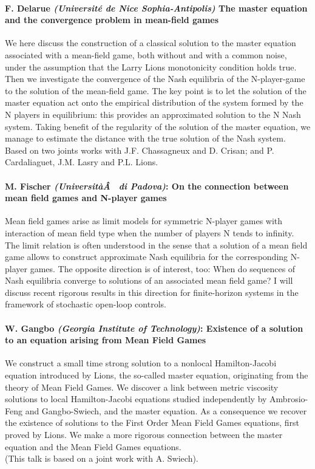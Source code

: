 \documentclass[11pt]{article}
\begin{document}
\paragraph{F. Delarue  {\sl (Universit{\'e}  de Nice Sophia-Antipolis)}
   The master equation and the convergence problem in mean-field games}
    We here discuss the construction of a classical solution to the 
master equation associated with a mean-field game, both without and with
 a common noise, under the assumption that the Larry Lions monotonicity 
condition holds true. Then we investigate the convergence of the Nash 
equilibria of the N-player-game to the solution of the mean-field game. 
The key point is to let the solution of the master equation act onto the
 empirical distribution of the system formed by the N players in 
equilibrium: this provides an approximated solution to the N Nash 
system. Taking benefit of the regularity of the solution of the master 
equation, we manage to estimate the distance with the true solution of 
the Nash system.\\
 Based on two joints works with J.F. Chassagneux and D. 
Crisan; and P. Cardaliaguet, J.M. Lasry and P.L. Lions. 

\paragraph{ M. Fischer {\sl (Universit{\`a}{\^A}  di Padova)}:
   On the connection between mean field games and N-player games}
Mean field games arise as limit models for symmetric N-player games 
with interaction of mean field type when the number of players N tends 
to infinity. The limit relation is often understood in the sense that a 
solution of a mean field game allows to construct approximate Nash 
equilibria for the corresponding N-player games. The opposite direction 
is of interest, too: When do sequences of Nash equilibria converge to 
solutions of an associated mean field game? I will discuss recent 
rigorous results in this direction for finite-horizon systems in the 
framework of stochastic open-loop controls. 


\paragraph{ W. Gangbo {\sl(Georgia Institute of Technology)}:  Existence of a solution to an equation arising from Mean Field Games}
 We construct a small time strong solution to a nonlocal 
Hamilton-Jacobi equation
introduced by Lions, the so-called master equation, originating from the
 theory of Mean Field
Games. We discover a link between metric viscosity solutions to local 
Hamilton-Jacobi equations
studied independently by Ambrosio-Feng and Gangbo-Swiech, and the master 
equation. As a consequence
we recover the existence of solutions to the First Order Mean Field 
Games equations, first proved by Lions. We make a more rigorous 
connection between the master equation and the Mean Field
Games equations. \\
(This talk is based on a joint work with A. Swiech).
\end{document}
